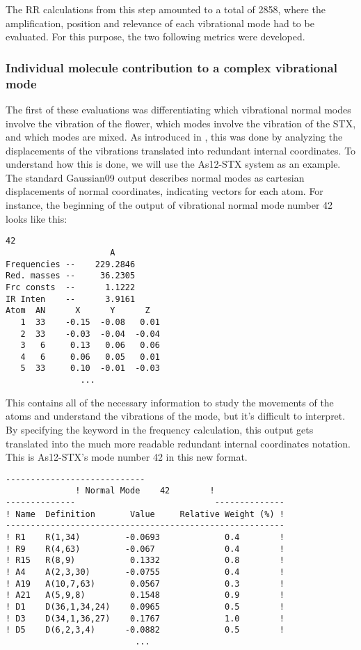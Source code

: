 The RR calculations from this step amounted to a total of 2858, where the amplification, position and relevance of each vibrational mode had to be evaluated.
For this purpose, the two following metrics were developed.

\subsubsection{Individual molecule contribution to a complex vibrational mode}
The first of these evaluations was differentiating which vibrational normal modes involve the vibration of the flower, which modes involve the vibration of the STX, and which modes are mixed.
As introduced in , this was done by analyzing the displacements of the vibrations translated into redundant internal coordinates.
To understand how this is done, we will use the As12-STX system as an example.
The standard Gaussian09 output describes normal modes as cartesian displacements of normal coordinates, indicating vectors for each atom.
For instance, the beginning of the output of vibrational normal mode number 42 looks like this:

\begin{lstlisting}[label=normal-mode-output, style=kaolstplain]
                    42
                     A
Frequencies --    229.2846
Red. masses --     36.2305
Frc consts  --      1.1222
IR Inten    --      3.9161
Atom  AN      X      Y      Z
   1  33    -0.15  -0.08   0.01
   2  33    -0.03  -0.04  -0.04
   3   6     0.13   0.06   0.06
   4   6     0.06   0.05   0.01
   5  33     0.10  -0.01  -0.03
               ...
\end{lstlisting}

This contains all of the necessary information to study the movements of the atoms and understand the vibrations of the mode, but it's difficult to interpret.
By specifying the keyword  in the frequency calculation, this output gets translated into the much more readable redundant internal coordinates notation.
This is As12-STX's mode number 42 in this new format.

\begin{lstlisting}[label=intmodes-output, style=kaolstplain]
              ----------------------------
              ! Normal Mode    42        !
--------------                            --------------
! Name  Definition       Value     Relative Weight (%) !
--------------------------------------------------------
! R1    R(1,34)         -0.0693             0.4        !
! R9    R(4,63)         -0.067              0.4        !
! R15   R(8,9)           0.1332             0.8        !
! A4    A(2,3,30)       -0.0755             0.4        !
! A19   A(10,7,63)       0.0567             0.3        !
! A21   A(5,9,8)         0.1548             0.9        !
! D1    D(36,1,34,24)    0.0965             0.5        !
! D3    D(34,1,36,27)    0.1767             1.0        !
! D5    D(6,2,3,4)      -0.0882             0.5        !
                          ...
\end{lstlisting}

